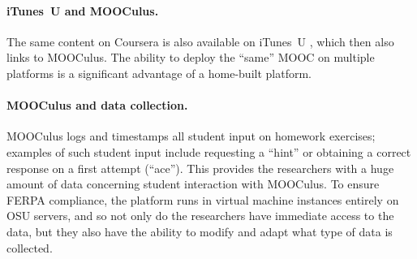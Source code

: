 \documentclass[12pt]{article}
\begin{document}
\paragraph{iTunes~U and MOOCulus.} The same content on Coursera is
also available on iTunes~U \parencite{itunesu}, which then also links
to MOOCulus.  The ability to deploy the ``same'' MOOC on multiple
platforms is a significant advantage of a home-built platform.

\paragraph{MOOCulus and data collection.} 
MOOCulus logs and timestamps all student input on homework exercises;
examples of such student input include requesting a ``hint'' or
obtaining a correct response on a first attempt (``ace'').  This
provides the researchers with a huge amount of data concerning student
interaction with MOOCulus.  To ensure FERPA compliance, the platform
runs in virtual machine instances entirely on OSU servers, and so not only do the researchers
have immediate access to the data, but they also have the ability to
modify and adapt what type of data is collected.
\end{document}
